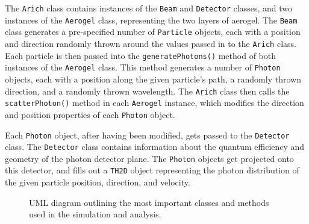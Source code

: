The \verb!Arich! class contains instances of the  \verb!Beam! and  \verb!Detector! classes, and two instances of the  \verb!Aerogel! class, representing the two layers of aerogel.
The  \verb!Beam! class generates a pre-specified number of \verb!Particle! objects, each with a position and direction randomly thrown around the values passed in to the \verb!Arich! class.
Each particle is then passed into the \verb!generatePhotons()! method of both instances of the \verb!Aerogel! class.
This method generates a number of \verb!Photon! objects, each with a position along the given particle's path, a randomly thrown direction, and a randomly thrown wavelength.
The \verb!Arich! class then calls the \verb!scatterPhoton()! method in each \verb!Aerogel! instance, which modifies the direction and position properties of each \verb!Photon! object. 

Each \verb!Photon! object, after having been modified, gets passed to the \verb!Detector! class.
The \verb!Detector! class contains information about the quantum efficiency and geometry of the photon detector plane. 
The \verb!Photon! objects get projected onto this detector, and fills out a \verb!TH2D! object representing the photon distribution of the given particle position, direction, and velocity.





\begin{figure}
\centering
{}
\caption[UML diagram outlining the most important classes and methods used in the simulation and analysis ]{UML diagram outlining the most important classes and methods used in the simulation and analysis. }
\label{fig:uml}

\end{figure}




